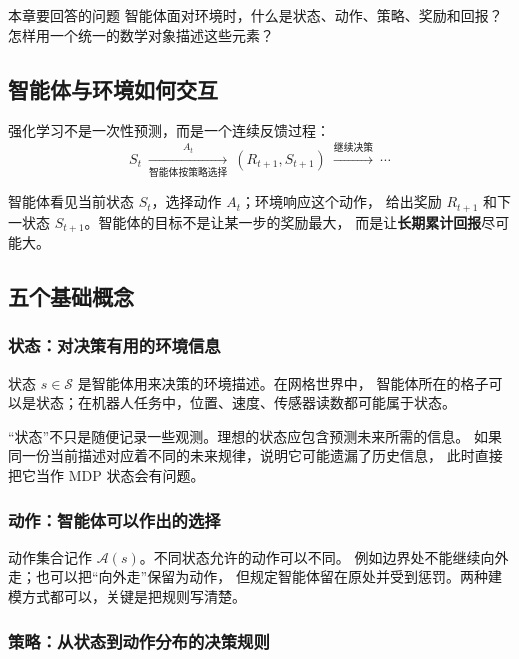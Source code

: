 \documentclass[11pt,a4paper,fontset=fandol]{ctexart}
\newcommand{\Sset}{\mathcal{S}}
\newcommand{\Aset}{\mathcal{A}}
\begin{document}
\begin{goalbox}{本章要回答的问题}
智能体面对环境时，什么是状态、动作、策略、奖励和回报？
怎样用一个统一的数学对象描述这些元素？
\end{goalbox}

\subsection{智能体与环境如何交互}

强化学习不是一次性预测，而是一个连续反馈过程：
\[
S_t
\ \xrightarrow[\text{智能体按策略选择}]{A_t}\
(R_{t+1},S_{t+1})
\ \xrightarrow{\text{继续决策}}\ \cdots
\]

智能体看见当前状态 \(S_t\)，选择动作 \(A_t\)；环境响应这个动作，
给出奖励 \(R_{t+1}\) 和下一状态 \(S_{t+1}\)。智能体的目标不是让某一步的奖励最大，
而是让\textbf{长期累计回报}尽可能大。

\subsection{五个基础概念}

\subsubsection{状态：对决策有用的环境信息}

状态 \(s\in\Sset\) 是智能体用来决策的环境描述。在网格世界中，
智能体所在的格子可以是状态；在机器人任务中，位置、速度、传感器读数都可能属于状态。

\begin{warningbox}
“状态”不只是随便记录一些观测。理想的状态应包含预测未来所需的信息。
如果同一份当前描述对应着不同的未来规律，说明它可能遗漏了历史信息，
此时直接把它当作 MDP 状态会有问题。
\end{warningbox}

\subsubsection{动作：智能体可以作出的选择}

动作集合记作 \(\Aset(s)\)。不同状态允许的动作可以不同。
例如边界处不能继续向外走；也可以把“向外走”保留为动作，
但规定智能体留在原处并受到惩罚。两种建模方式都可以，关键是把规则写清楚。

\subsubsection{策略：从状态到动作分布的决策规则}
\end{document}
